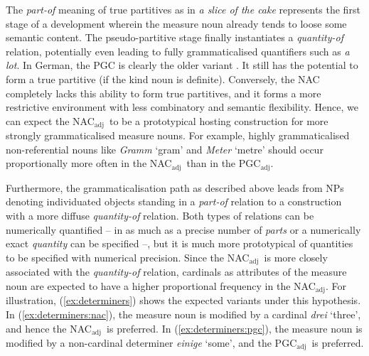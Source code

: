 \documentclass[USenglish]{article}
\newcommand{\Sub}[1]{\ensuremath{\mathrm{_{#1}}}}
\newcommand{\NACa}{NAC\Sub{adj}}
\newcommand{\PGCa}{PGC\Sub{adj}}
\begin{document}
The \textit{part-of} meaning of true partitives as in \textit{a slice of the cake} represents the first stage of a development wherein the measure noun already tends to loose some semantic content.
The pseudo-partitive stage finally instantiates a \textit{quantity-of} relation, potentially even leading to fully grammaticalised quantifiers such as \textit{a lot}.
In German, the PGC is clearly the older variant \citep{Zimmer2015}.
It still has the potential to form a true partitive (if the kind noun is definite).
Conversely, the NAC completely lacks this ability to form true partitives, and it forms a more restrictive environment with less combinatory and semantic flexibility.
Hence, we can expect the \NACa\ to be a prototypical hosting construction for more strongly grammaticalised measure nouns.
For example, highly grammaticalised non-referential nouns like \textit{Gramm} `gram' and \textit{Meter} `metre' should occur proportionally more often in the \NACa\ than in the \PGCa.


Furthermore, the grammaticalisation path as described above leads from NPs denoting individuated objects standing in a \textit{part-of} relation to a construction with a more diffuse \textit{quantity-of} relation.
Both types of relations can be numerically quantified -- in as much as a precise number of \textit{parts} or a numerically exact \textit{quantity} can be specified --, but it is much more prototypical of quantities to be specified with numerical precision.
Since the \NACa\ is more closely associated with the \textit{quantity-of} relation, cardinals as attributes of the measure noun are expected to have a higher proportional frequency in the \NACa.
For illustration, (\ref{ex:determiners}) shows the expected variants under this hypothesis.
In (\ref{ex:determiners:nac}), the measure noun is modified by a cardinal \textit{drei} `three', and hence the \NACa\ is preferred.
In (\ref{ex:determiners:pgc}), the measure noun is modified by a non-cardinal determiner \textit{einige} `some', and the \PGCa\ is preferred.
\end{document}
